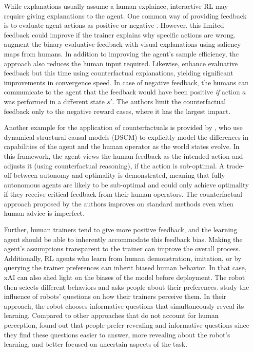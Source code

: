 \documentclass[twoside,11pt]{article}
\begin{document}
\begin{enumerate}
While explanations usually assume a human explainee, interactive RL may require giving explanations to the agent. One common way of providing feedback is to evaluate agent actions as positive or negative \citep{arakawa:18,Knox:2008:TAMER,knox:13,macglashan2017interactive}. However, this limited feedback could improve if the trainer explains why specific actions are wrong. \citet{guan2020explanation} augment the binary evaluative feedback with visual explanations using saliency maps from humans. In addition to improving the agent's sample efficiency, the approach also reduces the human input required.  Likewise, \citet{Karalus:2021:HITL-counterfactuals} enhance evaluative feedback but this time using counterfactual explanations, yielding significant improvements in convergence speed. In case of negative feedback, the humans can communicate to the agent that the feedback would have been positive \emph{if} action $a$ was performed in a different state $s'$. The authors limit the counterfactual feedback only to the negative reward cases, where it has the largest impact. 

Another example for the application of counterfactuals is provided by \citet{Pearl:2009:Causality}, who use dynamical structural causal models (DSCM) to explicitly model the differences in capabilities of the agent and the human operator as the world states evolve. In this framework, the agent views the human feedback as the intended action and adjusts it (using counterfactual reasoning), if the action is sub-optimal. A trade-off between autonomy and optimality is demonstrated, meaning that fully autonomous agents are likely to be sub-optimal and could only achieve optimality if they receive critical feedback from their human operators. The counterfactual approach proposed by the authors improves on standard methods even when human advice is imperfect.

Further, human trainers tend to give more positive feedback, and the learning agent should be able to inherently accommodate this feedback bias. Making the agent's assumptions transparent to the trainer can improve the overall process. Additionally, RL agents who learn from human demonstration, imitation, or by querying the trainer preferences can inherit biased human behavior. In that case, xAI can also shed light on the biases of the model before deployment. The robot then selects different behaviors and asks people about their preferences. \citet{habibian:21} study the influence of robots' questions on how their trainers perceive them. In their approach, the robot chooses informative questions that simultaneously reveal its learning. Compared to other approaches that do not account for human perception, \citet{habibian:21} found out that people prefer revealing and informative questions since they find these questions easier to answer, more revealing about the robot's learning, and better focused on uncertain aspects of the task. 


\end{enumerate}
\end{document}
